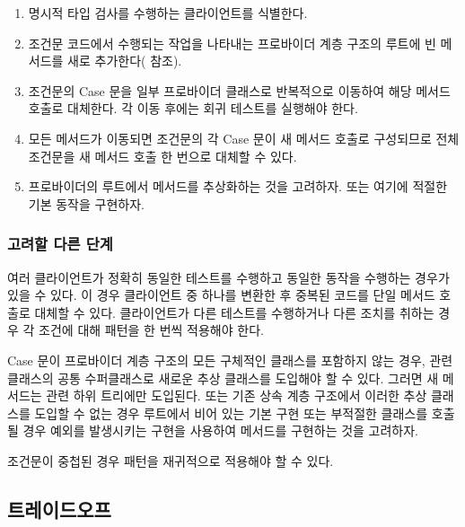 \documentclass[a4paper,10pt,twoside]{book}
\begin{document}
\begin{enumerate}
\item 명시적 타입 검사를 수행하는 클라이언트를 식별한다.

\item 조건문 코드에서 수행되는 작업을 나타내는 프로바이더 계층 구조의 루트에 빈 메서드를 새로 추가한다( 참조).

\item 조건문의 Case 문을 일부 프로바이더 클래스로 반복적으로 이동하여 해당 메서드 호출로 대체한다. 각 이동 후에는 회귀 테스트를 실행해야 한다.

\item 모든 메서드가 이동되면 조건문의 각 Case 문이 새 메서드 호출로 구성되므로 전체 조건문을 새 메서드 호출 한 번으로 대체할 수 있다.

\item 프로바이더의 루트에서 메서드를 추상화하는 것을 고려하자. 또는 여기에 적절한 기본 동작을 구현하자.
\end{enumerate}

\subsubsection*{고려할 다른 단계}

\begin{bulletlist}
\item 여러 클라이언트가 정확히 동일한 테스트를 수행하고 동일한 동작을 수행하는 경우가 있을 수 있다. 이 경우 클라이언트 중 하나를 변환한 후 중복된 코드를 단일 메서드 호출로 대체할 수 있다. 클라이언트가 다른 테스트를 수행하거나 다른 조치를 취하는 경우 각 조건에 대해 패턴을 한 번씩 적용해야 한다.

\item Case 문이 프로바이더 계층 구조의 모든 구체적인 클래스를 포함하지 않는 경우, 관련 클래스의 공통 수퍼클래스로 새로운 추상 클래스를 도입해야 할 수 있다. 그러면 새 메서드는 관련 하위 트리에만 도입된다. 또는 기존 상속 계층 구조에서 이러한 추상 클래스를 도입할 수 없는 경우 루트에서 비어 있는 기본 구현 또는 부적절한 클래스를 호출될 경우 예외를 발생시키는 구현을 사용하여 메서드를 구현하는 것을 고려하자.

\item 조건문이 중첩된 경우 패턴을 재귀적으로 적용해야 할 수 있다.
\end{bulletlist}

\subsection*{트레이드오프}
\end{document}
